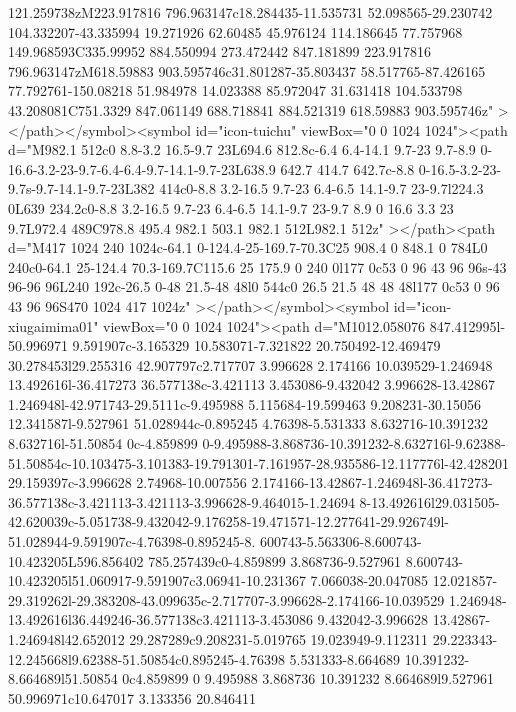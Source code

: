 {121.259738zM223.917816 796.963147c18.284435-11.535731 52.098565-29.230742 104.332207-43.335994 19.271926 62.60485 45.976124
114.186645 77.757968 149.968593C335.99952 884.550994 273.472442 847.181899 223.917816 796.963147zM618.59883
903.595746c31.801287-35.803437 58.517765-87.426165 77.792761-150.08218 51.984978 14.023388 85.972047 31.631418 104.533798
43.208081C751.3329 847.061149 688.718841 884.521319 618.59883 903.595746z"  ></path></symbol><symbol id="icon-tuichu" viewBox="0
0 1024 1024"><path d="M982.1 512c0 8.8-3.2 16.5-9.7 23L694.6 812.8c-6.4 6.4-14.1 9.7-23 9.7-8.9
0-16.6-3.2-23-9.7-6.4-6.4-9.7-14.1-9.7-23L638.9 642.7 414.7 642.7c-8.8 0-16.5-3.2-23-9.7s-9.7-14.1-9.7-23L382 414c0-8.8 3.2-16.5
9.7-23 6.4-6.5 14.1-9.7 23-9.7l224.3 0L639 234.2c0-8.8 3.2-16.5 9.7-23 6.4-6.5 14.1-9.7 23-9.7 8.9 0 16.6 3.3 23 9.7L972.4
489C978.8 495.4 982.1 503.1 982.1 512L982.1 512z"  ></path><path d="M417 1024 240 1024c-64.1 0-124.4-25-169.7-70.3C25 908.4 0
848.1 0 784L0 240c0-64.1 25-124.4 70.3-169.7C115.6 25 175.9 0 240 0l177 0c53 0 96 43 96 96s-43 96-96 96L240 192c-26.5 0-48
21.5-48 48l0 544c0 26.5 21.5 48 48 48l177 0c53 0 96 43 96 96S470 1024 417 1024z"  ></path></symbol><symbol id="icon-xiugaimima01"
viewBox="0 0 1024 1024"><path d="M1012.058076 847.412995l-50.996971 9.591907c-3.165329 10.583071-7.321822 20.750492-12.469479
30.278453l29.255316 42.907797c2.717707 3.996628 2.174166 10.039529-1.246948 13.492616l-36.417273 36.577138c-3.421113
3.453086-9.432042 3.996628-13.42867 1.246948l-42.971743-29.5111c-9.495988 5.115684-19.599463 9.208231-30.15056
12.341587l-9.527961 51.028944c-0.895245 4.76398-5.531333 8.632716-10.391232 8.632716l-51.50854 0c-4.859899
0-9.495988-3.868736-10.391232-8.632716l-9.62388-51.50854c-10.103475-3.101383-19.791301-7.161957-28.935586-12.117776l-42.428201
29.159397c-3.996628 2.74968-10.007556 2.174166-13.42867-1.246948l-36.417273-36.577138c-3.421113-3.421113-3.996628-9.464015-1.24694
8-13.492616l29.031505-42.620039c-5.051738-9.432042-9.176258-19.471571-12.277641-29.926749l-51.028944-9.591907c-4.76398-0.895245-8.
600743-5.563306-8.600743-10.423205L596.856402 785.257439c0-4.859899 3.868736-9.527961
8.600743-10.423205l51.060917-9.591907c3.06941-10.231367 7.066038-20.047085
12.021857-29.319262l-29.383208-43.099635c-2.717707-3.996628-2.174166-10.039529
1.246948-13.492616l36.449246-36.577138c3.421113-3.453086 9.432042-3.996628 13.42867-1.246948l42.652012
29.287289c9.208231-5.019765 19.023949-9.112311 29.223343-12.245668l9.62388-51.50854c0.895245-4.76398 5.531333-8.664689
10.391232-8.664689l51.50854 0c4.859899 0 9.495988 3.868736 10.391232 8.664689l9.527961 50.996971c10.647017 3.133356 20.846411
}
